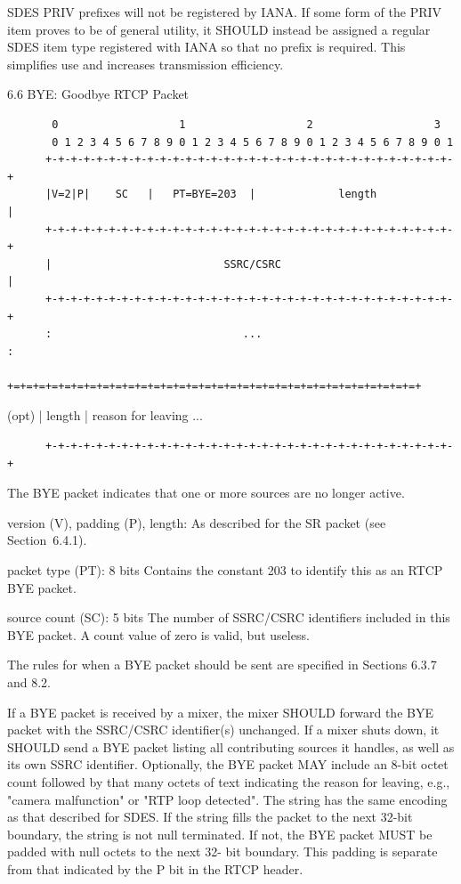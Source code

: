 \documentclass{article}
\begin{document}
SDES PRIV prefixes will not be registered by IANA.  If some form of the PRIV item proves to be of general utility, it SHOULD instead be assigned a regular SDES item type registered with IANA so that no prefix is required.  This simplifies use and increases transmission efficiency.

6.6 BYE: Goodbye RTCP Packet

\begin{verbatim}
       0                   1                   2                   3
       0 1 2 3 4 5 6 7 8 9 0 1 2 3 4 5 6 7 8 9 0 1 2 3 4 5 6 7 8 9 0 1
      +-+-+-+-+-+-+-+-+-+-+-+-+-+-+-+-+-+-+-+-+-+-+-+-+-+-+-+-+-+-+-+-+
      |V=2|P|    SC   |   PT=BYE=203  |             length            |
      +-+-+-+-+-+-+-+-+-+-+-+-+-+-+-+-+-+-+-+-+-+-+-+-+-+-+-+-+-+-+-+-+
      |                           SSRC/CSRC                           |
      +-+-+-+-+-+-+-+-+-+-+-+-+-+-+-+-+-+-+-+-+-+-+-+-+-+-+-+-+-+-+-+-+
      :                              ...                              :
      +=+=+=+=+=+=+=+=+=+=+=+=+=+=+=+=+=+=+=+=+=+=+=+=+=+=+=+=+=+=+=+=+
\end{verbatim}

(opt) |     length    |               reason for leaving            ...

\begin{verbatim}
      +-+-+-+-+-+-+-+-+-+-+-+-+-+-+-+-+-+-+-+-+-+-+-+-+-+-+-+-+-+-+-+-+
\end{verbatim}

The BYE packet indicates that one or more sources are no longer active.

version (V), padding (P), length: As described for the SR packet (see Section~6.4.1).

packet type (PT): 8 bits Contains the constant 203 to identify this as an RTCP BYE packet.

source count (SC): 5 bits The number of SSRC/CSRC identifiers included in this BYE packet. A count value of zero is valid, but useless.

The rules for when a BYE packet should be sent are specified in Sections 6.3.7 and 8.2.

If a BYE packet is received by a mixer, the mixer SHOULD forward the BYE packet with the SSRC/CSRC identifier(s) unchanged.  If a mixer shuts down, it SHOULD send a BYE packet listing all contributing sources it handles, as well as its own SSRC identifier.  Optionally, the BYE packet MAY include an 8-bit octet count followed by that many octets of text indicating the reason for leaving, e.g., "camera malfunction" or "RTP loop detected".  The string has the same encoding as that described for SDES.  If the string fills the packet to the next 32-bit boundary, the string is not null terminated.  If not, the BYE packet MUST be padded with null octets to the next 32- bit boundary.  This padding is separate from that indicated by the P bit in the RTCP header.
\end{document}
